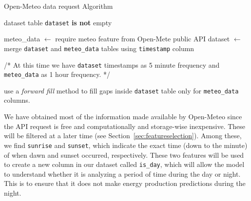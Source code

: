 
\begin{algorithm}[H]
	\caption{Open-Meteo data request Algorithm}\label{alg:openemeteo}
	\begin{algorithmic}
		\Require dataset table
		\Ensure \texttt{dataset} \textbf{is not} empty

		\State meteo\_data $\gets$ require meteo feature from Open-Mete public API
		\State dataset $\gets$ merge \texttt{dataset} and \texttt{meteo\_data} tables using \texttt{timestamp} column

		\State
		\State /* At this time we have \texttt{dataset} timestamps as 5 minute frequency and \texttt{meteo\_data} as 1 hour frequency. */
		\State

		\State use a \textit{forward fill} method to fill gaps inside \texttt{dataset} table only for \texttt{meteo\_data} columns.
	\end{algorithmic}
\end{algorithm}

We have obtained most of the information made available by Open-Meteo since the API
request is free \cite{openmeteo} and computationally and storage-wise inexpensive.
These will be filtered at a later time (see Section~\ref{sec:featureselection}).
Among these, we find \texttt{sunrise} and \texttt{sunset}, which indicate the exact time
(down to the minute) of when dawn and sunset occurred, respectively.
These two features will be used to create a new column in our dataset called
\texttt{is\_day}, which will allow the model to understand whether it is
analyzing a period of time during the day or night.
This is to ensure that it does not make energy production predictions
during the night.


